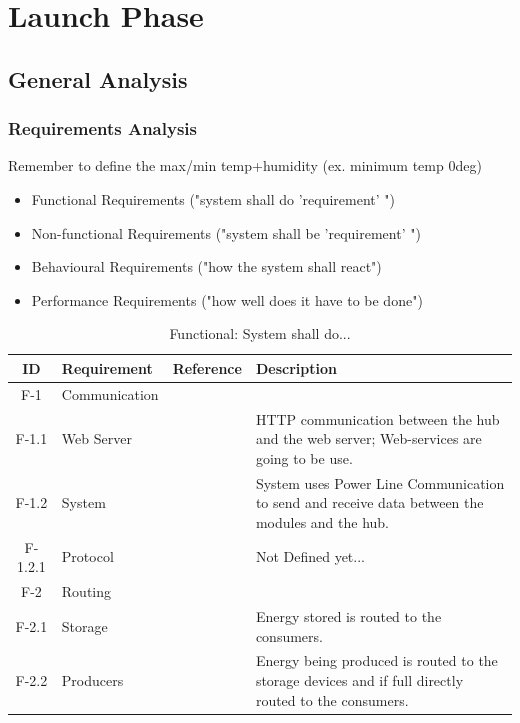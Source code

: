 \newpage
\section{Launch Phase}
\subsection{General Analysis}
	\subsubsection{Requirements	 Analysis}
		Remember to define the max/min temp+humidity (ex. minimum temp 0deg)
		\begin{itemize}
			\item Functional Requirements ("system shall do 'requirement' ")
			\item Non-functional Requirements ("system shall be 'requirement' ")
			\item Behavioural Requirements ("how the system shall react")
			\item Performance Requirements ("how well does it have to be done")
		\end{itemize}
		\begin{table}[h!]
		\begin{tabular} [b] {| c |  p{3cm} | c | p{10cm} |}
			\hline
			\textbf{ID} & \textbf{Requirement} & \textbf{Reference} & \textbf{Description} \\\hline
			F-1 & Communication &  &  \\ \hline
			F-1.1 & Web Server &  & HTTP communication between the hub and the web server; Web-services are going to be use. \\ \hline
			F-1.2 & System &  & System uses Power Line Communication to send and receive data between the modules and the hub. \\ \hline
			F-1.2.1 & Protocol &  & Not Defined yet... \\ \hline
			F-2 & Routing &  &  \\ \hline
			F-2.1 & Storage &  & Energy stored is routed to the consumers. \\ \hline
			F-2.2 & Producers &  & Energy being produced is routed to the storage devices and if full directly routed to the consumers. \\ \hline
		\end{tabular}
		\caption{Functional: System shall do...}
		\end{table}
		
